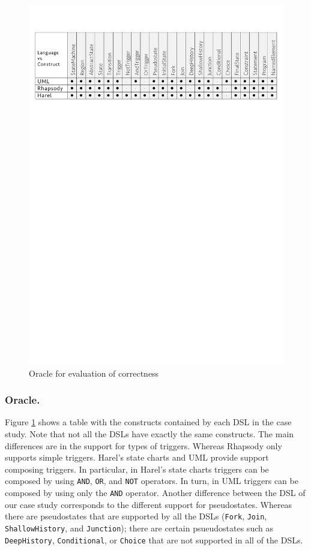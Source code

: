 \begin{figure}
\centering
\includegraphics[width=1\linewidth]{images/oracle.pdf}
\caption{Oracle for evaluation of correctness}
\label{fig:oracle}
\end{figure}

\subsubsection{Oracle.} Figure \ref{fig:oracle} shows a table with the constructs contained by each DSL in the case study. Note that not all the DSLs have exactly the same constructs. The main differences are in the support for types of triggers. Whereas Rhapsody only supports simple triggers. Harel's state charts and UML provide support composing triggers. In particular, in Harel's state charts triggers can be composed by using \texttt{AND}, \texttt{OR}, and \texttt{NOT} operators. In turn, in UML triggers can be composed by using only the \texttt{AND} operator. Another difference between the DSL of our case study corresponds to the different support for pseudostates. Whereas there are pseudostates that are supported by all the DSLs (\texttt{Fork}, \texttt{Join}, \texttt{ShallowHistory}, and \texttt{Junction}); there are certain psueudostates such as \texttt{DeepHistory}, \texttt{Conditional}, or \texttt{Choice} that are not supported in all of the DSLs.

